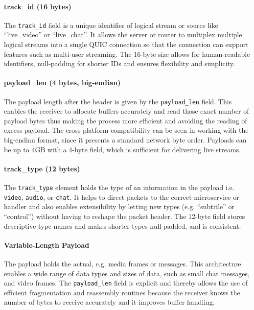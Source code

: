 {\paragraph{track_id (16 bytes)}
The \texttt{track\_id} field is a unique identifier of logical stream or source like ``live\_video'' or ``live\_chat''. It allows the server or router to multiplex multiple logical streams into a single QUIC connection so that the connection can support features such as multi-user streaming. The 16-byte size allows for human-readable identifiers, null-padding for shorter IDs and ensures flexibility and simplicity.

\paragraph{payload\_len (4 bytes, big-endian)}
The payload length after the header is given by the \texttt{payload\_len} field. This enables the receiver to allocate buffers accurately and read those exact number of payload bytes thus making the process more efficient and avoiding the reading of excess payload. The cross platform compatibility can be seen in working with the big-endian format, since it presents a standard network byte order. Payloads can be up to 4GB with a 4-byte field, which is sufficient for delivering live streams.

\paragraph{track\_type (12 bytes)}
The \texttt{track\_type} element holds the type of an information in the payload i.e. \texttt{video}, \texttt{audio}, or \texttt{chat}. It helps to direct packets to the correct microservice or handler and also enables extensibility by letting new types (e.g. ``subtitle'' or ``control'') without having to reshape the packet header. The 12-byte field stores descriptive type names and makes shorter types null-padded, and is consistent.

\paragraph{Variable-Length Payload}
The payload holds the actual, e.g. media frames or messages. This architecture enables a wide range of data types and sizes of data, such as small chat messages, and video frames. The \texttt{payload\_len} field is explicit and thereby allows the use of efficient fragmentation and reassembly routines because the receiver knows the number of bytes to receive accurately and it improves buffer handling.

}
